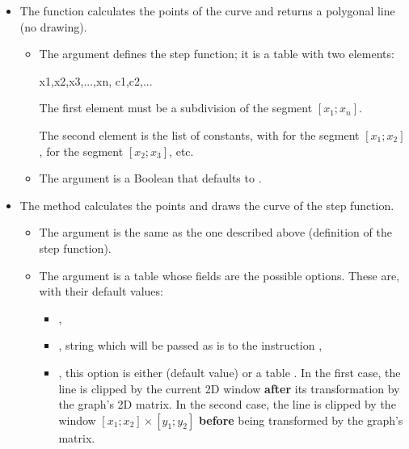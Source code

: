 \begin{itemize}
    \item The  function calculates the points of the curve and returns a polygonal line (no drawing).

\begin{itemize}
    \item The  argument defines the step function; it is a table with two elements:

\begin{TeXcode}
{ {x1,x2,x3,...,xn}, {c1,c2,...} }
\end{TeXcode}

The first element  must be a subdivision of the segment \([x_1;x_n]\).

The second element  is the list of constants, with  for the segment $[x_1;x_2]$,  for the segment $[x_2;x_3]$, etc.

    \item The argument  is a Boolean that defaults to \true.
\end{itemize}

    \item The method  calculates the points and draws the curve of the step function.

\begin{itemize}
    \item The argument  is the same as the one described above (definition of the step function).     
    \item The argument  is a table whose fields are the possible options. These are, with their default values:

\begin{itemize}
    \item {},
    \item {}, string which will be passed as is to the instruction \drawcmd,
    \item {}, this option is either \nil (default value) or a table . In the first case, the line is clipped by the current 2D window \textbf{after} its transformation by the graph's 2D matrix. In the second case, the line is clipped by the window $[x_1;x_2]\times[y_1;y_2]$ \textbf{before} being transformed by the graph's matrix.
\end{itemize}
\end{itemize}
\end{itemize}

